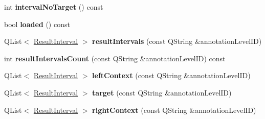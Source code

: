 \begin{DoxyCompactItemize}
int {\bfseries interval\+No\+Target} () const
\item 
\mbox{\label{class_query_occurrence_a86ff5cc1419ffb56901b2ea0e4d15219}} 
bool {\bfseries loaded} () const
\item 
\mbox{\label{class_query_occurrence_ae058ce31eead338635809fdf7a025cce}} 
Q\+List$<$ \hyperlink{class_query_occurrence_1_1_result_interval}{Result\+Interval} $>$ {\bfseries result\+Intervals} (const Q\+String \&annotation\+Level\+ID)
\item 
\mbox{\label{class_query_occurrence_a4944f887bcdf0649637e93092e7c1218}} 
int {\bfseries result\+Intervals\+Count} (const Q\+String \&annotation\+Level\+ID) const
\item 
\mbox{\label{class_query_occurrence_a0dac33426c9a5ebbf4a3006529f5b7a2}} 
Q\+List$<$ \hyperlink{class_query_occurrence_1_1_result_interval}{Result\+Interval} $>$ {\bfseries left\+Context} (const Q\+String \&annotation\+Level\+ID)
\item 
\mbox{\label{class_query_occurrence_a2844d34ee3361a95f5ddc2d7e9628c21}} 
Q\+List$<$ \hyperlink{class_query_occurrence_1_1_result_interval}{Result\+Interval} $>$ {\bfseries target} (const Q\+String \&annotation\+Level\+ID)
\item 
\mbox{\label{class_query_occurrence_a2c3b5e1051d408646cc43429d795eb8d}} 
Q\+List$<$ \hyperlink{class_query_occurrence_1_1_result_interval}{Result\+Interval} $>$ {\bfseries right\+Context} (const Q\+String \&annotation\+Level\+ID)
\end{DoxyCompactItemize}
